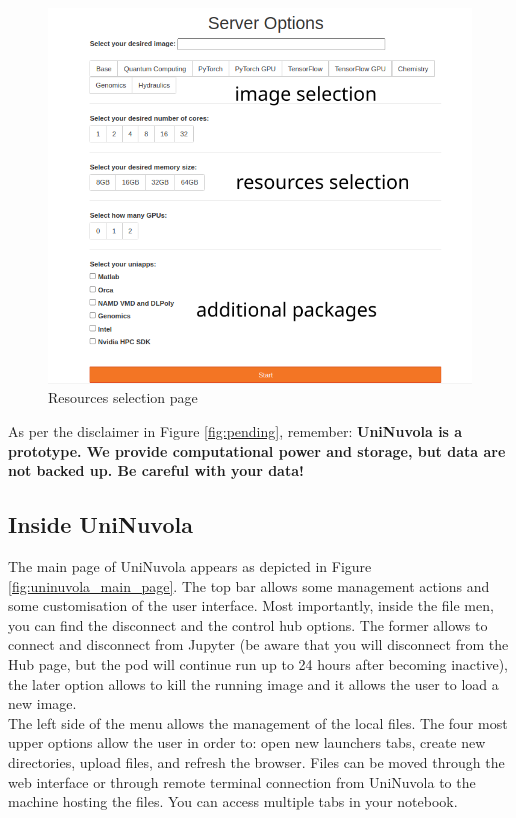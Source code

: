 \begin{figure}[!ht]
    \centering
    \includegraphics[width=0.75\linewidth]{img/resource_selection.png}
    \caption{Resources selection page}
    \label{fig:resources}
\end{figure}

As per the disclaimer in Figure \ref{fig:pending}, remember: \textbf{UniNuvola is a prototype. We provide computational
    power and storage, but data are not backed up. Be careful with your data!} \\

\subsection{Inside UniNuvola}
The main page of UniNuvola appears as depicted in Figure \ref{fig:uninuvola_main_page}. The top bar allows some
management actions and some customisation of the user interface. Most importantly, inside the file men, you can find the
disconnect and  the control hub options. The former allows to connect and disconnect from Jupyter (be aware that you
will disconnect from the Hub page, but the pod will continue run up to 24 hours after becoming inactive), the later
option allows to kill the running image and it allows the user to load a new image. \\

The left side of the menu allows the management of the local files. The four most upper options allow the user in order
to: open new launchers tabs, create new directories, upload files, and refresh the browser. Files can be moved through
the web interface or through remote terminal connection from UniNuvola to the machine hosting the files. You can access multiple tabs in your notebook.\\ 

